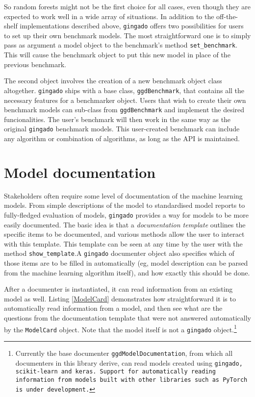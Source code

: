 \documentclass{article}
\begin{document}
So random forests might not be the first choice for all cases, even though they are expected to work well in a wide array of situations. In addition to the off-the-shelf implementations described above, \texttt{gingado} offers two possibilities for users to set up their own benchmark models. The most straightforward one is to simply pass as argument a model object to the benchmark's method \texttt{set\_benchmark}. This will cause the benchmark object to put this new model in place of the previous benchmark. 

The second object involves the creation of a new benchmark object class altogether. \texttt{gingado} ships with a base class, \texttt{ggdBenchmark}, that contains all the necessary features for a benchmarker object. Users that wish to create their own benchmark models can sub-class from \texttt{ggdBenchmark} and implement the desired funcionalities. The user's benchmark will then work in the same way as the original \texttt{gingado} benchmark models. This user-created benchmark can include any algorithm or combination of algorithms, as long as the API is maintained.

\section{Model documentation} \label{doc}

Stakeholders often require some level of documentation of the machine learning models. From simple descriptions of the model to standardised model reports to fully-fledged evaluation of models, \texttt{gingado} provides a way for models to be more easily documented. The basic idea is that a \textit{documentation template} outlines the specific items to be documented, and various methods allow the user to interact with this template. This template can be seen at any time by the user with the method \texttt{show\_template}.A \texttt{gingado} documenter object also specifies which of those items are to be filled in automatically (eg, model description can be parsed from the machine learning algorithm itself), and how exactly this should be done.

After a documenter is instantiated, it can read information from an existing model as well. Listing \ref{ModelCard} demonstrates how straightforward it is to automatically read information from a model, and then see what are the questions from the documentation template that were not answered automatically by the \texttt{ModelCard} object. Note that the model itself is not a \texttt{gingado} object.\footnote{Currently the base documenter \texttt{ggdModelDocumentation}, from which all documenters in this library derive, can read models created using \texttt{gingado, \texttt{scikit-learn} and \texttt{keras}. Support for automatically reading information from models built with other libraries such as \texttt{PyTorch} is under development.}}
\end{document}
